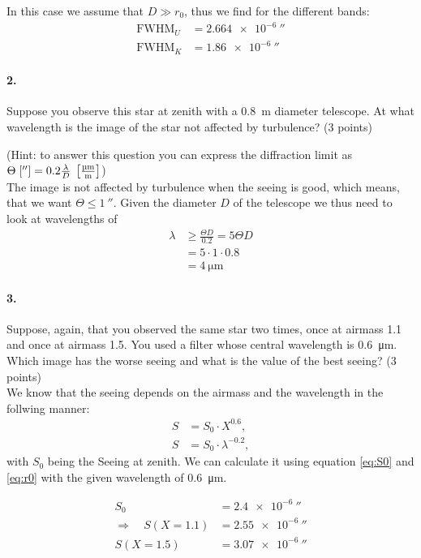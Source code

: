 \documentclass[11pt,a4paper,twoside]{article}
\begin{document}
In this case we assume that $D \gg r_0$, thus we find for the different bands:
\begin{align}
    \mathrm{FWHM}_U &= \SI{2.664e-6}{\arcsecond}   \\
    \mathrm{FWHM}_K &= \SI{1.86e-6}{\arcsecond}
\end{align}

\paragraph{2.} Suppose you observe this star at zenith with a \SI{0.8}{\meter}
diameter telescope. At what wavelength is the image of the star not affected by
turbulence? (3 points) 

(Hint: to answer this question you can express the diffraction limit as
$\Theta\;[\si{\arcsecond}] = 0.2\frac{\lambda}{D} \;
\left[\si[per-mode=fraction]{\micro\meter\per\meter}\right]$) \\

The image is not affected by turbulence when the seeing is good, which means,
that we want $\Theta \leq \SI{1}{\arcsecond}$. Given the diameter $D$ of the 
telescope we thus need to look at wavelengths of
\begin{align}
\lambda &\geq \frac{\Theta D}{0.2} = 5\Theta D\\
        &= 5\cdot 1 \cdot 0.8 \\
        &= \SI{4}{\micro\meter}
\end{align}

\paragraph{3.} Suppose, again, that you observed the same star two times, once
at airmass 1.1 and once at airmass 1.5. You used a filter whose central
wavelength is \SI{0.6}{\micro\meter}.  Which image has the worse seeing and
what is the value of the best seeing?  (3 points) \\

We know that the seeing depends on the airmass and the wavelength in the follwing
manner:
\begin{align}
S &= S_0 \cdot X^{0.6},  \\
S &= S_0 \cdot \lambda^{-0.2},
\end{align}
with $S_0$ being the Seeing at zenith. We can calculate it using equation
\ref{eq:S0} and \ref{eq:r0} with the given wavelength of \SI{0.6}{\micro\meter}.

\begin{align}
S_0 &= \SI{2.4e-6}{\arcsecond} \\
\Rightarrow\quad S(X=1.1) &= \SI{2.55e-6}{\arcsecond} \\
S(X=1.5) &= \SI{3.07e-6}{\arcsecond}
\end{align}
\end{document}

